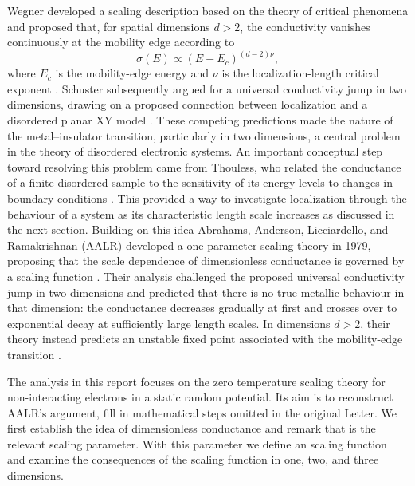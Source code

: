 Wegner developed a
scaling description based on the theory of critical phenomena and proposed that, for spatial dimensions $d>2$, the conductivity vanishes continuously at the mobility edge according to
\begin{equation}
    \sigma(E) \propto (E-E_c)^{(d-2)\nu},
\end{equation}
where $E_c$ is the mobility-edge energy and $\nu$ is the localization-length critical exponent \cite{Wegner1976}. Schuster subsequently argued for a universal conductivity jump in two dimensions, drawing on a proposed connection between localization and a disordered planar XY model \cite{AharonyImry1977,Schuster1978}. These competing predictions made the nature of the metal--insulator transition, particularly in two dimensions, a central problem in the theory of disordered electronic systems.
An important conceptual step toward resolving this problem came from Thouless, who related the conductance of a finite disordered sample to the sensitivity of its energy levels to changes in boundary conditions \cite{Thouless1974}. This provided a way to investigate localization through the behaviour of a system as its characteristic length scale increases as discussed in the next section. Building on this idea Abrahams, Anderson, Licciardello, and Ramakrishnan (AALR) developed a one-parameter scaling theory in 1979, proposing that the scale dependence of dimensionless conductance is governed by a scaling function \cite{AALR1979}. Their analysis challenged the proposed universal conductivity jump in two dimensions and predicted that there is no true metallic behaviour in that dimension: the conductance decreases gradually at first and crosses over to exponential decay at sufficiently large length scales. In dimensions $d>2$, their theory instead predicts an unstable fixed point associated with the mobility-edge transition \cite{AALR1979,LeeRamakrishnan1985}.

The analysis in this report focuses on the zero temperature scaling theory for non-interacting electrons in a static random potential. Its aim is to reconstruct AALR's argument, fill in mathematical steps omitted in the original Letter.
We first establish the idea of dimensionless conductance and remark that  is the relevant scaling parameter. With this parameter we define an scaling function and examine the consequences of the scaling function in one, two, and three dimensions. 
